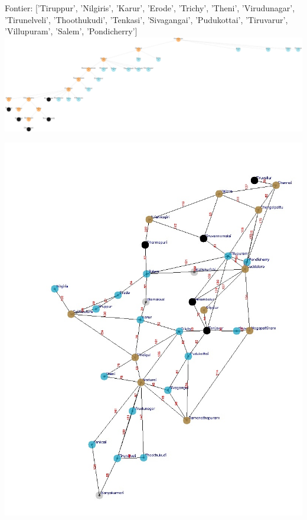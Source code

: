 \documentclass[xcolor=table]{beamer}
\begin{document}
\begin{frame}
  { \tiny Fontier: ['Tiruppur', 'Nilgiris', 'Karur', 'Erode', 'Trichy', 'Theni', 'Virudunagar', 'Tirunelveli', 'Thoothukudi', 'Tenkasi', 'Sivagangai', 'Pudukottai', 'Tiruvarur', 'Villupuram', 'Salem', 'Pondicherry']}
  \includegraphics[width=1\textwidth]{../DFSNodes/23-1.png}
  \begin{center}
    \includegraphics[height=0.45\textheight]{../DFSoutput/tamilDFS21.jpg}
  \end{center}
\end{frame}
\end{document}
